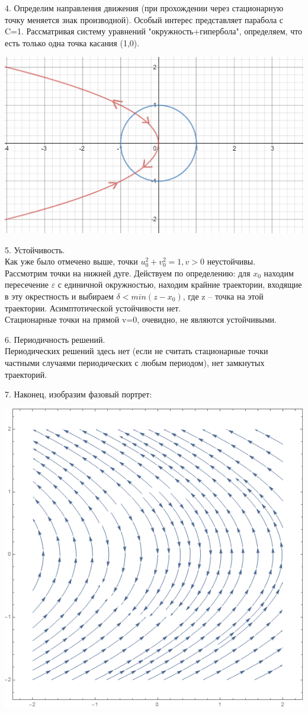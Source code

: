 \documentclass[10pt]{report}
\begin{document}
4. Определим направления движения (при прохождении через стационарную точку меняется знак производной). Особый интерес представляет парабола с C=1. Рассматривая систему уравнений "окружность+гипербола", определяем, что есть только одна точка касания (1,0).
\begin{center}
{\includegraphics[scale=0.35]{graph15.2.png}} 
\end{center}

5. Устойчивость.\\
Как уже было отмечено выше, точки $u_0^2+v_0^2=1, v>0$ неустойчивы. \\
Рассмотрим точки на нижней дуге. Действуем по определению: для $x_0$ находим пересечение $\varepsilon$  с единичной окружностью, находим крайние траектории, входящие в эту окрестность и выбираем $\delta<min(z-x_0)$, где z -- точка на этой траектории. Асимптотической устойчивости нет. \\
Стационарные точки на прямой v=0, очевидно, не являются устойчивыми.
  
6. Периодичность решений.\\
Периодических решений здесь нет (если не считать стационарные точки частными случаями периодических с любым периодом), нет замкнутых траекторий. 

7. Наконец, изобразим фазовый портрет:
\begin{center}
{\includegraphics[scale=0.4]{graph15.1.png}} 
\end{center}
\end{document}
